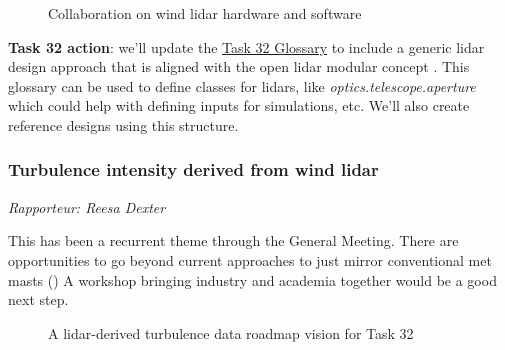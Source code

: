 \begin{figure}[p]
\centering
{}
\caption{Collaboration on wind lidar hardware and software}
\label{fig:day3-collaboration-hardware-software}
\end{figure}

\textbf{Task 32 action}: we'll update the \href{https://github.com/IEA-Wind-Task-32/wind-lidar-glossary}{Task 32 Glossary} to include a generic lidar design approach that is aligned with the open lidar modular concept \cite{clifton_2019_openlidar}. This glossary can be used to define classes for lidars, like \emph{optics.telescope.aperture} which could help with defining inputs for simulations, etc. We'll also create reference designs using this structure.

\subsubsection{Turbulence intensity derived from wind lidar}

\emph{Rapporteur: Reesa Dexter}

This has been a recurrent theme through the General Meeting. There are opportunities to go beyond current approaches to just mirror conventional met masts () A workshop bringing industry and academia together would be a good next step.

\begin{figure}[p]
    \centering
    \caption{A lidar-derived turbulence data roadmap vision for Task 32 }
    \label{fig:day3-Ti-group}
\end{figure}

